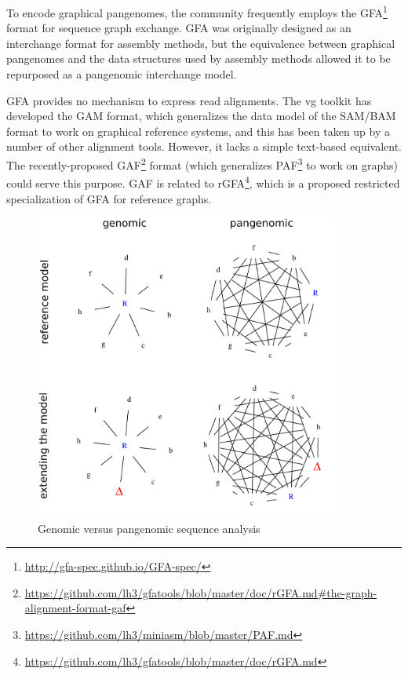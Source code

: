 To encode graphical pangenomes, the community frequently employs the GFA\footnote{\url{http://gfa-spec.github.io/GFA-spec/}} format for sequence graph exchange.
GFA was originally designed as an interchange format for assembly methods, but the equivalence between graphical pangenomes and the data structures used by assembly methods allowed it to be repurposed as a pangenomic interchange model.

GFA provides no mechanism to express read alignments.
The vg toolkit has developed the GAM format, which generalizes the data model of the SAM/BAM format to work on graphical reference systems, and this has been taken up by a number of other alignment tools.
However, it lacks a simple text-based equivalent.
The recently-proposed GAF\footnote{\url{https://github.com/lh3/gfatools/blob/master/doc/rGFA.md#the-graph-alignment-format-gaf}} format (which generalizes PAF\footnote{\url{https://github.com/lh3/miniasm/blob/master/PAF.md}} to work on graphs) could serve this purpose.
GAF is related to rGFA\footnote{\url{https://github.com/lh3/gfatools/blob/master/doc/rGFA.md}}, which is a proposed restricted specialization of GFA for reference graphs.


\begin{figure}[h]
    \includegraphics[width=0.9\textwidth]{figures/fig1.pdf}
    \caption{\label{fig:models} Genomic versus pangenomic sequence analysis}
\end{figure}


